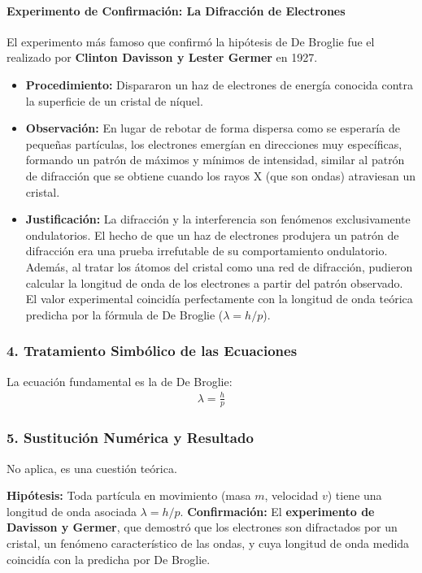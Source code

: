 \paragraph{Experimento de Confirmación: La Difracción de Electrones}
El experimento más famoso que confirmó la hipótesis de De Broglie fue el realizado por \textbf{Clinton Davisson y Lester Germer} en 1927.
\begin{itemize}
    \item \textbf{Procedimiento:} Dispararon un haz de electrones de energía conocida contra la superficie de un cristal de níquel.
    \item \textbf{Observación:} En lugar de rebotar de forma dispersa como se esperaría de pequeñas partículas, los electrones emergían en direcciones muy específicas, formando un patrón de máximos y mínimos de intensidad, similar al patrón de difracción que se obtiene cuando los rayos X (que son ondas) atraviesan un cristal.
    \item \textbf{Justificación:} La difracción y la interferencia son fenómenos exclusivamente ondulatorios. El hecho de que un haz de electrones produjera un patrón de difracción era una prueba irrefutable de su comportamiento ondulatorio. Además, al tratar los átomos del cristal como una red de difracción, pudieron calcular la longitud de onda de los electrones a partir del patrón observado. El valor experimental coincidía perfectamente con la longitud de onda teórica predicha por la fórmula de De Broglie ($\lambda=h/p$).
\end{itemize}

\subsubsection*{4. Tratamiento Simbólico de las Ecuaciones}
La ecuación fundamental es la de De Broglie:
\begin{gather}
    \lambda = \frac{h}{p}
\end{gather}

\subsubsection*{5. Sustitución Numérica y Resultado}
No aplica, es una cuestión teórica.
\begin{cajaresultado}
\textbf{Hipótesis:} Toda partícula en movimiento (masa $m$, velocidad $v$) tiene una longitud de onda asociada $\lambda = h/p$.
\textbf{Confirmación:} El \textbf{experimento de Davisson y Germer}, que demostró que los electrones son difractados por un cristal, un fenómeno característico de las ondas, y cuya longitud de onda medida coincidía con la predicha por De Broglie.
\end{cajaresultado}

